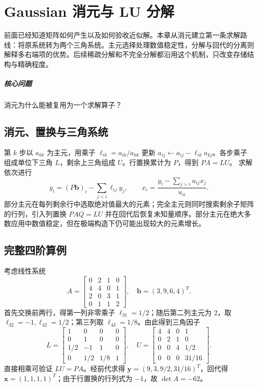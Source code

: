 \chapter{Gaussian 消元与 LU 分解}\label{v0ch:4}
\begin{chaptersummary}
前面已经知道矩阵如何产生以及如何验收近似解。本章从消元建立第一条求解路线：将原系统转为两个三角系统。主元选择处理数值稳定性，分解与回代的分离则解释多右端项的优势。后续稀疏分解和不完全分解都沿用这个机制，只改变存储结构与精确程度。
\end{chaptersummary}
\paragraph{核心问题}消元为什么能被复用为一个求解算子？

\section{消元、置换与三角系统}
第 $k$ 步以 $a_{kk}$ 为主元，用乘子 $\ell_{ik}=a_{ik}/a_{kk}$ 更新
$a_{ij}\leftarrow a_{ij}-\ell_{ik}a_{kj}$。各步乘子组成单位下三角 $L$，剩余上三角组成 $U$。行置换累计为 $P$，得到 $PA=LU$。
求解依次进行
\[
 y_i=(P\bm b)_i-\sum_{j<i}\ell_{ij}y_j,\qquad
 x_i=\frac{y_i-\sum_{j>i}u_{ij}x_j}{u_{ii}}.
\]
部分主元在每列剩余行中选取绝对值最大的元素；完全主元则同时搜索剩余子矩阵的行列，引入列置换 $PAQ=LU$ 并在回代后恢复未知量顺序。部分主元在绝大多数应用中数值稳定，但在极端构造下仍可能出现较大的元素增长。
\section{完整四阶算例}
考虑线性系统
\[
 A=\begin{bmatrix}0&2&1&0\\4&4&0&1\\2&0&3&1\\0&1&1&2\end{bmatrix},
 \quad \bm b=(3,9,6,4)^T.
\]
首先交换前两行，得第一列非零乘子 $\ell_{31}=1/2$；随后第二列主元为 2，取 $\ell_{32}=-1,\ell_{42}=1/2$；第三列取 $\ell_{43}=1/8$。由此得到三角因子
\[
 L=\begin{bmatrix}1&0&0&0\\0&1&0&0\\1/2&-1&1&0\\0&1/2&1/8&1\end{bmatrix},
 \quad U=\begin{bmatrix}4&4&0&1\\0&2&1&0\\0&0&4&1/2\\0&0&0&31/16\end{bmatrix}.
\]
直接相乘可验证 $LU=PA$。经前代求得 $\bm y=(9,3,9/2,31/16)^T$，回代得 $\bm x=(1,1,1,1)^T$；由于行置换的行列式为 $-1$，故 $\det A=-62$。
